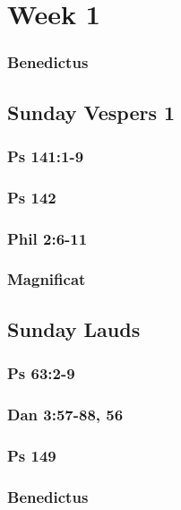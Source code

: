 \chapter{Week 1}

\subsection{Benedictus}


\section{Sunday Vespers 1}

\subsection{Ps 141:1-9}

\subsection{Ps 142}

\subsection{Phil 2:6-11}

\subsection{Magnificat}


\section{Sunday Lauds}

\subsection{Ps 63:2-9}

\subsection{Dan 3:57-88, 56}

\subsection{Ps 149}

\subsection{Benedictus}


